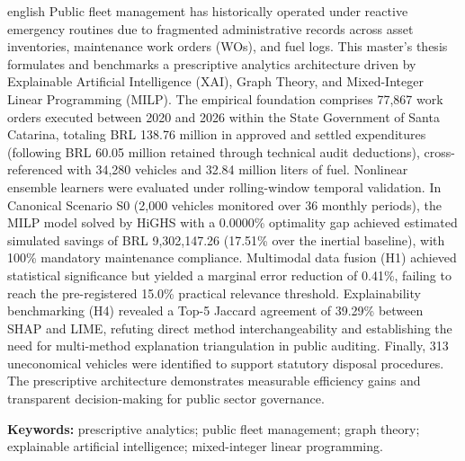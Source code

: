 \begin{resumo}[ABSTRACT]
\begin{otherlanguage*}{english}
Public fleet management has historically operated under reactive emergency routines due to fragmented administrative records across asset inventories, maintenance work orders (WOs), and fuel logs. This master's thesis formulates and benchmarks a prescriptive analytics architecture driven by Explainable Artificial Intelligence (XAI), Graph Theory, and Mixed-Integer Linear Programming (MILP). The empirical foundation comprises 77,867 work orders executed between 2020 and 2026 within the State Government of Santa Catarina, totaling BRL 138.76 million in approved and settled expenditures (following BRL 60.05 million retained through technical audit deductions), cross-referenced with 34,280 vehicles and 32.84 million liters of fuel. Nonlinear ensemble learners were evaluated under rolling-window temporal validation. In Canonical Scenario S0 (2,000 vehicles monitored over 36 monthly periods), the MILP model solved by HiGHS with a 0.0000\% optimality gap achieved estimated simulated savings of BRL 9,302,147.26 (17.51\% over the inertial baseline), with 100\% mandatory maintenance compliance. Multimodal data fusion (H1) achieved statistical significance but yielded a marginal error reduction of 0.41\%, failing to reach the pre-registered 15.0\% practical relevance threshold. Explainability benchmarking (H4) revealed a Top-5 Jaccard agreement of 39.29\% between SHAP and LIME, refuting direct method interchangeability and establishing the need for multi-method explanation triangulation in public auditing. Finally, 313 uneconomical vehicles were identified to support statutory disposal procedures. The prescriptive architecture demonstrates measurable efficiency gains and transparent decision-making for public sector governance.

\vspace{\onelineskip}
\noindent
\textbf{Keywords:} prescriptive analytics; public fleet management; graph theory; explainable artificial intelligence; mixed-integer linear programming.
\end{otherlanguage*}
\end{resumo}
